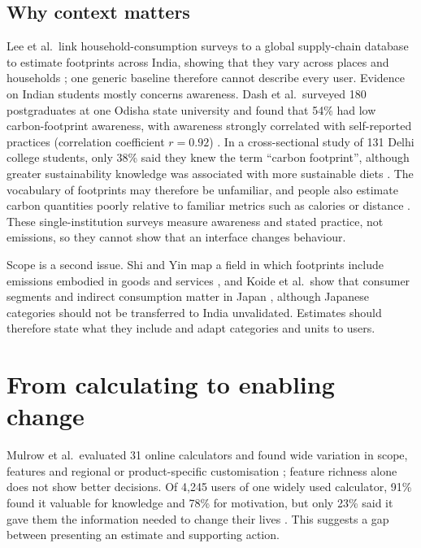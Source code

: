 \documentclass[10pt,a4paper,twocolumn]{article}
\begin{document}
\subsection{Why context matters}
Lee et al.\ link household-consumption surveys to a global supply-chain database to estimate footprints across India, showing that they vary across places and households \cite{lee2021}; one generic baseline therefore cannot describe every user. Evidence on Indian students mostly concerns awareness. Dash et al.\ surveyed 180 postgraduates at one Odisha state university and found that 54\% had low carbon-footprint awareness, with awareness strongly correlated with self-reported practices (correlation coefficient $r=0.92$) \cite{dash2023}. In a cross-sectional study of 131 Delhi college students, only 38\% said they knew the term ``carbon footprint'', although greater sustainability knowledge was associated with more sustainable diets \cite{gandhi2025}. The vocabulary of footprints may therefore be unfamiliar, and people also estimate carbon quantities poorly relative to familiar metrics such as calories or distance \cite{grinstein2018}. These single-institution surveys measure awareness and stated practice, not emissions, so they cannot show that an interface changes behaviour.

Scope is a second issue. Shi and Yin map a field in which footprints include emissions embodied in goods and services \cite{shi2021}, and Koide et al.\ show that consumer segments and indirect consumption matter in Japan \cite{koide2019}, although Japanese categories should not be transferred to India unvalidated. Estimates should therefore state what they include and adapt categories and units to users.

\section{From calculating to enabling change}
Mulrow et al.\ evaluated 31 online calculators and found wide variation in scope, features and regional or product-specific customisation \cite{mulrow2019}; feature richness alone does not show better decisions. Of 4,245 users of one widely used calculator, 91\% found it valuable for knowledge and 78\% for motivation, but only 23\% said it gave them the information needed to change their lives \cite{collins2020}. This suggests a gap between presenting an estimate and supporting action.
\end{document}
